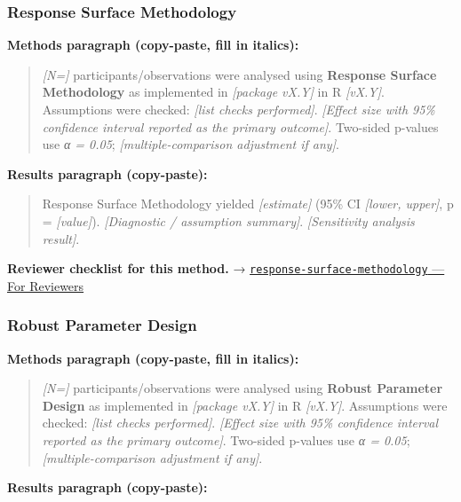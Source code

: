 \documentclass[
]{article}
\begin{document}
\subsubsection{Response Surface
Methodology}\label{response-surface-methodology}

\textbf{Methods paragraph (copy-paste, fill in italics):}

\begin{quote}
\emph{{[}N={]}} participants/observations were analysed using
\textbf{Response Surface Methodology} as implemented in \emph{{[}package
vX.Y{]}} in R \emph{{[}vX.Y{]}}. Assumptions were checked: \emph{{[}list
checks performed{]}}. \emph{{[}Effect size with 95\% confidence interval
reported as the primary outcome{]}}. Two-sided p-values use \emph{α =
0.05}; \emph{{[}multiple-comparison adjustment if any{]}}.
\end{quote}

\textbf{Results paragraph (copy-paste):}

\begin{quote}
Response Surface Methodology yielded \emph{{[}estimate{]}} (95\% CI
\emph{{[}lower, upper{]}}, p = \emph{{[}value{]}}). \emph{{[}Diagnostic
/ assumption summary{]}}. \emph{{[}Sensitivity analysis result{]}}.
\end{quote}

\textbf{Reviewer checklist for this method.} →
\href{../chapters/16-design/response-surface-methodology.Rmd\#for-reviewers}{\texttt{response-surface-methodology}
--- For Reviewers}

\subsubsection{Robust Parameter Design}\label{robust-parameter-design}

\textbf{Methods paragraph (copy-paste, fill in italics):}

\begin{quote}
\emph{{[}N={]}} participants/observations were analysed using
\textbf{Robust Parameter Design} as implemented in \emph{{[}package
vX.Y{]}} in R \emph{{[}vX.Y{]}}. Assumptions were checked: \emph{{[}list
checks performed{]}}. \emph{{[}Effect size with 95\% confidence interval
reported as the primary outcome{]}}. Two-sided p-values use \emph{α =
0.05}; \emph{{[}multiple-comparison adjustment if any{]}}.
\end{quote}

\textbf{Results paragraph (copy-paste):}
\end{document}
